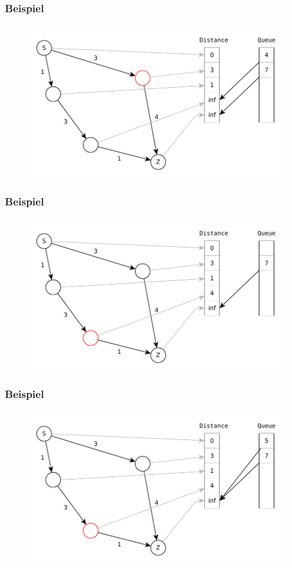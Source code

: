 \begin{frame}
\frametitle{Beispiel}
\begin{figure}
\includegraphics[scale=.8]{dijkstra_graphs/dijkstra_5.pdf}
\end{figure}
\end{frame}

\begin{frame}
\frametitle{Beispiel}
\begin{figure}
\includegraphics[scale=.8]{dijkstra_graphs/dijkstra_6.pdf}
\end{figure}
\end{frame}

\begin{frame}
\frametitle{Beispiel}
\begin{figure}
\includegraphics[scale=.8]{dijkstra_graphs/dijkstra_7.pdf}
\end{figure}
\end{frame}

